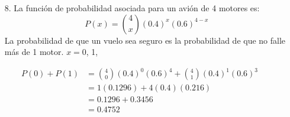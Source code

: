 \documentclass[10pt,letterpaper]{article}
\author{Germán Avendaño Ramírez}
\begin{document}
\begin{itemize}
\item[8.] La función de probabilidad asociada para un avi\'{o}n de 4 motores es:
\[P(x)=\displaystyle{4 \choose x}(0.4)^{x}(0.6)^{4-x}\]
La probabilidad de que un vuelo sea seguro es la probabilidad de que no falle más de 1 motor.
$x=0$, 1, 
\end{itemize}
\begin{align*}
P(0)+P(1)&=\displaystyle{4 \choose 0}(0.4)^{0}(0.6)^{4}+\displaystyle{4 \choose 1}(0.4)^{1}(0.6)^{3}\\
&=1(0.1296)+4(0.4)(0.216)\\
&=0.1296+0.3456\\
&=0.4752
\end{align*}
\end{document}
